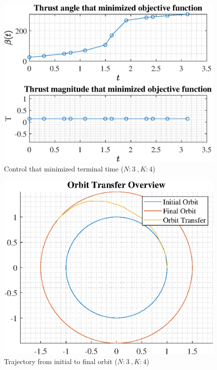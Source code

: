 \documentclass[]{article}
\begin{document}
\begin{figure}
	\centering
	\includegraphics[scale=0.75]{control_N3_K4_C2_tf.eps}
	\caption{Control that minimized terminal time (\(N:3\ , K:4\))}
	\label{fig:control_N3_K4_C2_tf}
\end{figure}
\begin{figure}
	\centering
	\includegraphics[scale=0.75]{orbit_N3_K4_C2_tf.eps}
	\caption{Trajectory from initial to final orbit (\(N:3\ , K:4\))}
	\label{fig:orbit_N3_K4_C2_tf}
\end{figure}
\end{document}
